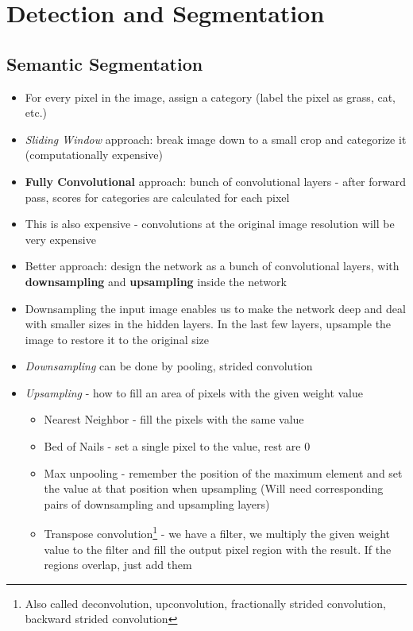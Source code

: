 \section{Detection and Segmentation}
\subsection{Semantic Segmentation}
\begin{itemize}
	\item For every pixel in the image, assign a category (label the pixel as grass, cat, etc.)
	\item \textit{Sliding Window} approach: break image down to a small crop and categorize it (computationally expensive)
	\item \textbf{Fully Convolutional} approach: bunch of convolutional layers - after forward pass, scores for categories are calculated for each pixel
	\item This is also expensive - convolutions at the original image resolution will be very expensive
	\item Better approach: design the network as a bunch of convolutional layers, with \textbf{downsampling} and \textbf{upsampling} inside the network
	\item Downsampling the input image enables us to make the network deep and deal with smaller sizes in the hidden layers. In the last few layers, upsample the image to restore it to the original size
	\item \textit{Downsampling} can be done by pooling, strided convolution
	\item \textit{Upsampling} - how to fill an area of pixels with the given weight value
	\begin{itemize}
		\item Nearest Neighbor - fill the pixels with the same value
		\item Bed of Nails - set a single pixel to the value, rest are 0
		\item Max unpooling - remember the position of the maximum element and set the value at that position when upsampling (Will need corresponding pairs of downsampling and upsampling layers)
		\item Transpose convolution\footnote{Also called deconvolution, upconvolution, fractionally strided convolution, backward strided convolution} - we have a filter, we multiply the given weight value to the filter and fill the output pixel region with the result. If the regions overlap, just add them
	\end{itemize}
\end{itemize}

